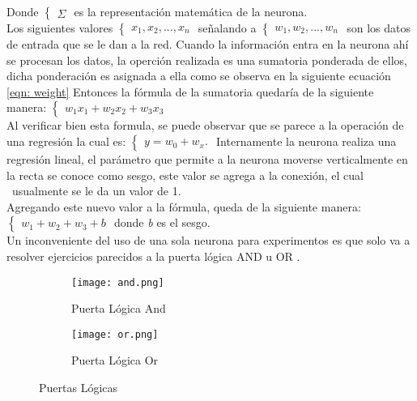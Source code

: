         Donde
        $\begin{cases}  
            \Sigma
        \end{cases}$
        es la representaci\'on matem\'atica de la neurona. \\
        Los siguientes valores
        $\begin{cases}
            x_1, x_2, ... , x_n
        \end{cases}$
        señalando a 
        $\begin{cases} \label{eqn: weight}
            w_1, w_2, ... , w_n 
        \end{cases}$ 
        son los datos de entrada que se le dan a la red.
        Cuando la información entra en la neurona ah\'i se procesan los datos, la operci\'on realizada 
        es una sumatoria ponderada de ellos, dicha ponderaci\'on es asignada a ella como se observa en la siguiente 
        ecuaci\'on \eqref{eqn: weight}
        Entonces la f\'ormula de la sumatoria quedar\'ia de la siguiente manera:
        $\begin{cases} \label{eqn: summation}
            w_1x_1 + w_2x_2 + w_3x_3
        \end{cases}$ \\
        Al verificar bien esta formula, se puede observar que se parece a la operaci\'on de una regresi\'on 
        la cual es:
        $\begin{cases}
            y = w_0 + w_x.
        \end{cases}$
        Internamente la neurona realiza una regresi\'on lineal, el parámetro que permite a la neurona 
        moverse verticalmente en la recta se conoce como sesgo, este valor se agrega a la conexi\'on, el cual \
        usualmente se le da un valor de 1. \\
        Agregando este nuevo valor a la f\'ormula, queda de la siguiente manera: \\
        $\begin{cases}
            w_1 + w_2 + w_3 + b
        \end{cases}$ 
        donde \textit{b} es el sesgo. \\
        
        Un inconveniente del uso de una sola neurona para experimentos es que solo 
        va a resolver ejercicios parecidos a la puerta l\'ogica AND u OR \label{sec: one neuron}.
        
        \begin{figure}[H]
            \begin{subfigure}[H]{0.49\textwidth}
                \texttt{[image: and.png]}
                \caption{Puerta L\'ogica And}
                \label{fig:f2}
            \end{subfigure}
            \hfill
            \begin{subfigure}[H]{0.49\textwidth}
                \texttt{[image: or.png]}
                \caption{Puerta L\'ogica Or}
                \label{fig:f2}
            \end{subfigure}
            \caption{Puertas L\'ogicas \cite{mcmahon2014}}
        \end{figure}
        
